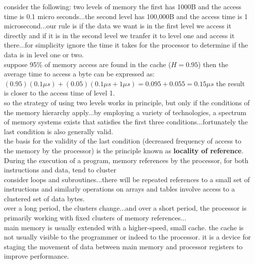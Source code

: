 \documentclass[parindent=0pt]{article}
\begin{document}
consider the following: two levels of memory the first has 1000B and the access time is 0.1 micro seconds...the second level has 100,000B and the access time is 1 microsecond...our rule is if the data we want is in the first level we access it directly and if it is in the second level we tranfer it to level one and access it there...for simplicity ignore the time it takes for the processor to determine if the data is in level one or two.\\

suppose 95\% of memory access are found in the cache ($H = 0.95$) then the average time to access a byte can be expressed as: $(0.95)(0.1\mu s) + (0.05)(0.1\mu s + 1\mu s) = 0.095 + 0.055 = 0.15 \mu s$ the result is closer to the access time of level 1.\\

so the strategy of using two levels works in principle, but only if the conditions of the memory hierarchy apply...by employing a variety of technologies, a spectrum of memory systems exists that satisfies the first three conditions...fortunately the last condition is also generally valid.\\

the basis for the validity of the last condition (decreased frequency of access to the memory by the processor) is the principle known as \textbf{locality of reference}.\\

During the execution of a program, memory references by the processor, for both instructions and data, tend to cluster\\

consider loops and subroutines...there will be repeated references to a small set of instructions and similarly operations on arrays and tables involve access to a clustered set of data bytes.\\

over a long period, the clusters change...and over a short period, the processor is primarily working with fixed clusters of memory references...\\

main memory is usually extended with a higher-speed, small cache. the cache is not usually visible to the programmer or indeed to the processor. it is a device for staging the movement of data between main memory and processor registers to improve performance.
\end{document}
